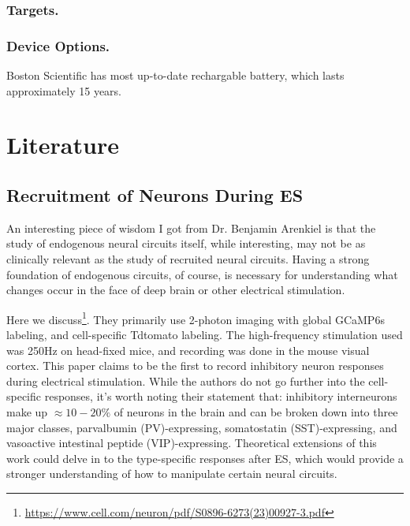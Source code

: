 \subsubsection{Targets.}



\subsubsection{Device Options.}

Boston Scientific has most up-to-date rechargable battery, which lasts approximately 15 years. 
 



\section{Literature}

    \subsection{Recruitment of Neurons During ES}

    An interesting piece of wisdom I got from Dr. Benjamin Arenkiel is that the study of endogenous neural circuits itself, while interesting, may not be as clinically relevant as the study of recruited neural circuits. Having a strong foundation of endogenous circuits, of course, is necessary for understanding what changes occur in the face of deep brain or other electrical stimulation. \newline

    Here we discuss\footnote{\url{https://www.cell.com/neuron/pdf/S0896-6273(23)00927-3.pdf}}.  They primarily use 2-photon imaging with global GCaMP6s labeling, and cell-specific Tdtomato labeling. The high-frequency stimulation used was 250Hz on head-fixed mice, and recording was done in the mouse visual cortex.  This paper claims to be the first to record inhibitory neuron responses during electrical stimulation. While the authors do not go further into the cell-specific responses, it's worth noting their statement that: inhibitory interneurons make up $\approx 10-20\%$ of neurons in the brain and can be broken down into three major classes, parvalbumin (PV)-expressing, somatostatin (SST)-expressing, and vasoactive intestinal peptide (VIP)-expressing. Theoretical extensions of this work could delve in to the type-specific responses after ES, which would provide a stronger understanding of how to manipulate certain neural circuits. 
    
